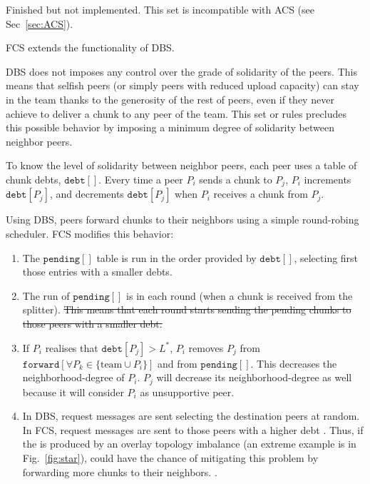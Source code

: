 
\label{sec:FCS}


\begin{notex}
  Finished but not implemented. This set is incompatible with ACS (see Sec~\ref{sec:ACS}).
\end{notex}

FCS extends the functionality of DBS.

DBS does not imposes any control over the grade of solidarity of the
peers. This means that selfish peers (or simply peers with reduced
upload capacity) can stay in the team thanks to the generosity of the
rest of peers, even if they never achieve to deliver a chunk to any
peer of the team. This set or rules precludes this possible behavior
by imposing a minimum degree of solidarity between neighbor peers.

To know the level of solidarity between neighbor peers, each peer uses
a table of chunk debts, $\mathtt{debt}[]$. Every time a peer $P_i$
sends a chunk to $P_j$, $P_i$ increments $\mathtt{debt}[P_j]$, and
decrements $\mathtt{debt}[P_j]$ when $P_i$ receives a chunk from
$P_j$. 

Using DBS, peers forward chunks to their neighbors using a simple
round-robing scheduler. FCS modifies this behavior:
\begin{enumerate}
\item The $\mathtt{pending}[]$ table is run in the order provided by
  $\mathtt{debt}[]$, selecting first those entries with a smaller
  debts.
\item The  run of $\mathtt{pending}[]$ is  in each round (when a
  chunk is received from the splitter). \st{This means that each round
  starts sending the pending chunks to those peers with a smaller
  debt.} 
\item If $P_i$ realises that $\mathtt{debt}[P_j]>L^*$, $P_i$ removes
  $P_j$ from $\mathtt{forward}[\forall P_k\in\{\text{team}\cup P_i\}]$
  and from $\mathtt{pending}[]$. This decreases the
  \gls{neighborhood-degree} of $P_i$. $P_j$ will decrease its \gls{neighborhood-degree} as well
  because it will consider $P_i$ as unsupportive peer.
\item In DBS, request messages are sent selecting the destination peers
  at random. In FCS, request messages are sent to those peers with a
  higher debt . Thus, if the  is produced by an overlay
  topology imbalance (an extreme example is in Fig.~\ref{fig:star}),
   could have the chance of mitigating this
  problem by forwarding more chunks to their neighbors. .
\end{enumerate}

